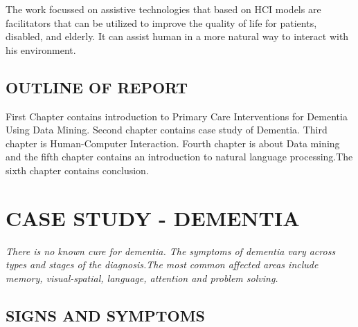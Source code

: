 The work focussed on assistive technologies that based on HCI models are facilitators that can be utilized to improve the quality of life for patients, disabled, and elderly. It can assist human in a more natural way to interact with his environment. 

\section{OUTLINE OF REPORT}

First Chapter contains introduction to Primary Care Interventions for Dementia Using Data Mining. Second chapter contains case study of Dementia. Third chapter is  Human-Computer Interaction. Fourth chapter is  about Data mining and the fifth chapter contains an introduction to natural language processing.The sixth chapter contains conclusion.



\chapter{ CASE STUDY - DEMENTIA}			%

{\em There is no known cure for dementia. The symptoms of dementia vary across types and stages of the diagnosis.The most common affected areas include memory, visual-spatial, language, attention and problem solving. }

\section{SIGNS AND SYMPTOMS}

